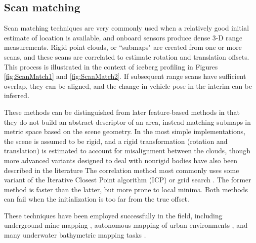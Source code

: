 \subsection{Scan matching}

Scan matching techniques are very commonly used when a relatively good initial estimate of location is available, and onboard sensors produce dense 3-D range measurements. Rigid point clouds, or ``submaps" are created from one or more scans, and these scans are correlated to estimate rotation and translation offsets. This process is illustrated in the context of iceberg profiling in Figures \ref{fig:ScanMatch1} and \ref{fig:ScanMatch2}. If subsequent range scans have sufficient overlap, they can be aligned, and the change in vehicle pose in the interim can be inferred. 

These methods can be distinguished from later feature-based methods in that they do not build an abstract descriptor of an area, instead matching submaps in metric space based on the scene geometry. In the most simple implementations, the scene is assumed to be rigid, and a rigid transformation (rotation and translation) is estimated to account for misalignment between the clouds, though more advanced variants designed to deal with nonrigid bodies have also been described in the literature \cite{Amberg2007, Feldmar1996,Haehnel2003} The correlation method most commonly uses some variant of the Iterative Closest Point algorithm (ICP) \cite{Besl1992} or grid search \cite{Miller2013}. The former method is faster than the latter, but more prone to local minima. Both methods can fail when the initialization is too far from the true offset. 

These techniques have been employed successfully in the field, including underground mine mapping \cite{Bosse2003}, autonomous mapping of urban environments \cite{Thrun2006}, and many underwater bathymetric mapping tasks \cite{Caress2008}.

